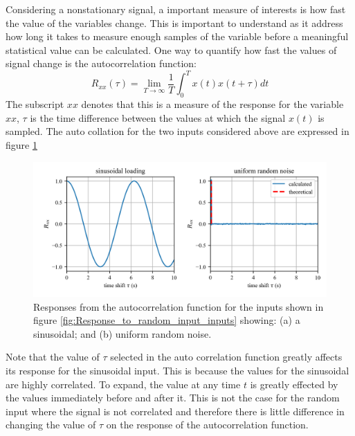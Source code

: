 \documentclass[12pt,letter]{article}
\numberwithin{ex}{section} %
\numberwithin{re}{section} %
\begin{document}
Considering a nonstationary signal, a important measure of interests is how fast the value of the variables change. This is important to understand as it address how long it takes to measure enough samples of the variable before a meaningful statistical value can be calculated. One way to quantify how fast the values of signal change is the autocorrelation function: 
\begin{equation}
R_{xx}(\tau) = \lim\limits_{T \rightarrow \infty} \frac{1}{T} \int_{0}^{T}x(t)x(t+\tau)dt
\end{equation}
The subscript $xx$ denotes that this is a measure of the response for the variable $xx$, $\tau$ is the time difference between the values at which the signal $x(t)$ is sampled. The auto collation for the two inputs considered above are expressed in figure \ref{fig:Response_to_random_input_autocorrelation}
\begin{figure}[H]
	\centering
	\includegraphics[width=1\textwidth]{../figures/Response_to_random_input_autocorrelation.png}
	\caption{Responses from the autocorrelation function for the inputs shown in figure \ref{fig:Response_to_random_input_inputs} showing: (a) a sinusoidal; and (b) uniform random noise.}
	\label{fig:Response_to_random_input_autocorrelation}
\end{figure}
\noindent Note that the value of $\tau$ selected in the auto correlation function greatly affects its response for the sinusoidal input. This is because the values for the sinusoidal are highly correlated. To expand, the value at any time $t$ is greatly effected by the values immediately before and after it. This is not the case for the random input where the signal is not correlated and therefore there is little difference in changing the value of $\tau$ on the response of the autocorrelation function.  
\end{document}
